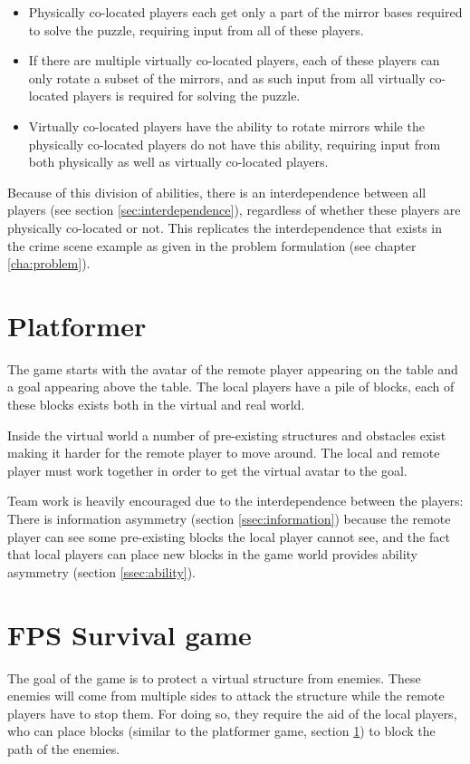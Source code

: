 	\begin{itemize}
		\item Physically co-located players each get only a part of the
		      mirror bases required to solve the puzzle, requiring input
		      from all of these players.
		\item If there are multiple virtually co-located players, each of
		      these players can only rotate a subset of the mirrors, and
		      as such input from all virtually co-located players is
		      required for solving the puzzle.
		\item Virtually co-located players have the ability to rotate
		      mirrors while the physically co-located players do not have
		      this ability, requiring input from both physically as well
		      as virtually co-located players.
	\end{itemize}

	Because of this division of abilities, there is an interdependence
	between all players (see section \ref{sec:interdependence}), regardless of
	whether these players are physically co-located or not. This replicates the
	interdependence that exists in the crime scene example as given in the
	problem formulation (see chapter \ref{cha:problem}).

\section{Platformer} \label{sec:platformer}
	The game starts with the avatar of the remote player appearing
	on the table and a goal appearing above the table. The local
  players have a pile of blocks, each of these blocks exists both
  in the virtual and real world.

	Inside the virtual world a number of pre-existing structures and
	obstacles exist making it harder for the remote player to move around.
	The local and remote player must work together in order to get the
	virtual avatar to the goal.

	Team work is heavily encouraged due to the interdependence between the
	players: There is information asymmetry (section \ref{ssec:information})
	because the remote player can see some pre-existing blocks the local
	player cannot see, and the fact that local players can place new blocks
	in the game world provides ability asymmetry (section \ref{ssec:ability}).

\section{FPS Survival game} \label{sec:fpssurvival}
	The goal of the game is to protect a virtual structure from enemies. These
	enemies will come from multiple sides to attack the structure while the
	remote players have to stop them. For doing so, they require the aid of the
	local players, who can place blocks (similar to the platformer game, section
	\ref{sec:platformer}) to block the path of the enemies.

